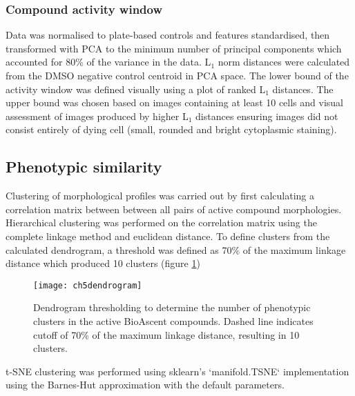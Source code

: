 \documentclass[a4paper,11pt,twoside,openright]{scrbook}
\begin{document}
\subsubsection{Compound activity window}
Data was normalised to plate-based controls and features standardised, then transformed with PCA to the minimum number of principal components which accounted for 80\% of the variance in the data.
L$_1$ norm distances were calculated from the DMSO negative control centroid in PCA space.
The lower bound of the activity window was defined visually using a plot of ranked L$_1$ distances.
The upper bound was chosen based on images containing at least 10 cells and visual assessment of images produced by higher L$_1$ distances ensuring images did not consist entirely of dying cell (small, rounded and bright cytoplasmic staining).


\subsection{Phenotypic similarity}
Clustering of morphological profiles was carried out by first calculating a correlation matrix between between all pairs of active compound morphologies.
Hierarchical clustering was performed on the correlation matrix using the complete linkage method and euclidean distance.
To define clusters from the calculated dendrogram, a threshold was defined as 70\% of the maximum linkage distance which produced 10 clusters (figure \ref{figure:dendrogram_cut})

\begin{figure}
    \captionsetup{width=0.8\textwidth}
    \caption[Dendrogram threshold to determine clusters]{
Dendrogram thresholding to determine the number of phenotypic clusters in the active BioAscent compounds.
Dashed line indicates cutoff of 70\% of the maximum linkage distance, resulting in 10 clusters.
}
    \texttt{[image: ch5dendrogram]}
    \label{figure:dendrogram_cut}
\end{figure}

t-SNE clustering was performed using sklearn's `manifold.TSNE` implementation using the Barnes-Hut approximation with the default parameters.
\end{document}
